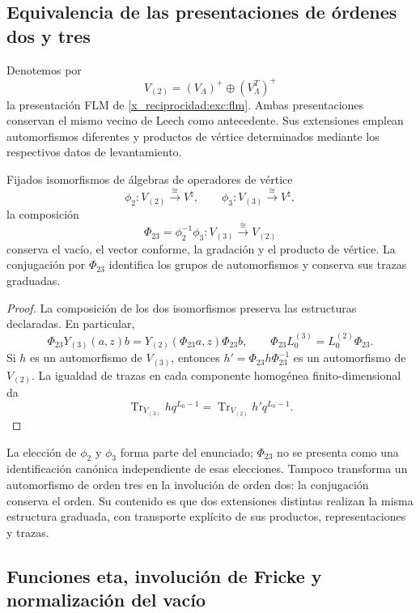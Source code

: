 \subsection{Equivalencia de las presentaciones de órdenes dos y tres}
\label{x_reciprocidad:km:equivalencia-dos-tres}

Denotemos por
\[
 V_{(2)}=(V_\Lambda)^+\oplus(V_\Lambda^T)^+
\]
la presentación FLM de \eqref{x_reciprocidad:exc:flm}. Ambas presentaciones conservan
el mismo vecino de Leech como antecedente. Sus extensiones emplean
automorfismos diferentes y productos de vértice determinados mediante
los respectivos datos de levantamiento.

\begin{theorem}
\label{x_reciprocidad:km:equivalencia-voa}
Fijados isomorfismos de álgebras de operadores de vértice
\[
 \phi_2:V_{(2)}\xrightarrow{\ \cong\ }V^\natural,
 \qquad
 \phi_3:V_{(3)}\xrightarrow{\ \cong\ }V^\natural,
\]
la composición
\begin{equation}
 \Phi_{23}=\phi_2^{-1}\phi_3:
 V_{(3)}\xrightarrow{\ \cong\ }V_{(2)}
 \label{x_reciprocidad:km:Phi23}
\end{equation}
conserva el vacío, el vector conforme, la gradación y el producto de
vértice. La conjugación por \(\Phi_{23}\) identifica los grupos de
automorfismos y conserva sus trazas graduadas.
\end{theorem}
\begin{proof}
La composición de los dos isomorfismos preserva las estructuras
declaradas. En particular,
\[
 \Phi_{23}Y_{(3)}(a,z)b
 =Y_{(2)}(\Phi_{23}a,z)\Phi_{23}b,
 \qquad
 \Phi_{23}L_0^{(3)}=L_0^{(2)}\Phi_{23}.
\]
Si \(h\) es un automorfismo de \(V_{(3)}\), entonces
\(h' =\Phi_{23}h\Phi_{23}^{-1}\) es un automorfismo de
\(V_{(2)}\). La igualdad de trazas en cada componente homogénea
finito-dimensional da
\[
 \operatorname{Tr}_{V_{(3)}}h q^{L_0-1}
 =\operatorname{Tr}_{V_{(2)}}h' q^{L_0-1}.
\]
\end{proof}

La elección de \(\phi_2\) y \(\phi_3\) forma parte del enunciado;
\(\Phi_{23}\) no se presenta como una identificación canónica
independiente de esas elecciones. Tampoco transforma un automorfismo
de orden tres en la involución de orden dos: la conjugación conserva
el orden. Su contenido es que dos extensiones distintas realizan la
misma estructura graduada, con transporte explícito de sus productos,
representaciones y trazas.

\subsection{Funciones eta, involución de Fricke y normalización del vacío}
\label{x_reciprocidad:km:fricke}

